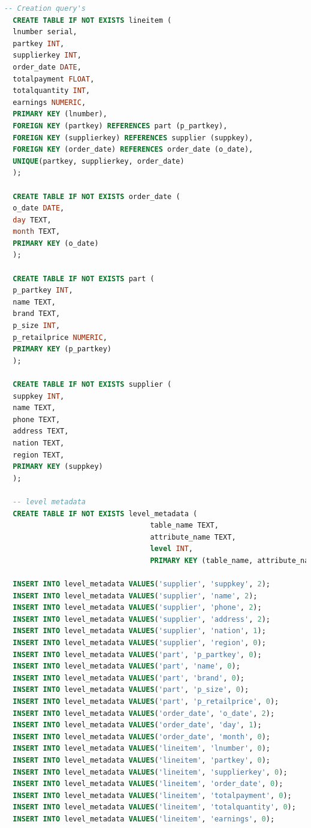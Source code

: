 \begin{lstlisting}[label={genquery2}, caption={Consultas de creaci\'on generadas para el experimento 2}, language={sql}]
  -- Creation query's
  CREATE TABLE IF NOT EXISTS lineitem (
  lnumber serial, 
  partkey INT, 
  supplierkey INT, 
  order_date DATE, 
  totalpayment FLOAT, 
  totalquantity INT, 
  earnings NUMERIC, 
  PRIMARY KEY (lnumber), 
  FOREIGN KEY (partkey) REFERENCES part (p_partkey), 
  FOREIGN KEY (supplierkey) REFERENCES supplier (suppkey), 
  FOREIGN KEY (order_date) REFERENCES order_date (o_date), 
  UNIQUE(partkey, supplierkey, order_date)
  );

  CREATE TABLE IF NOT EXISTS order_date (
  o_date DATE, 
  day TEXT, 
  month TEXT, 
  PRIMARY KEY (o_date)
  );

  CREATE TABLE IF NOT EXISTS part (
  p_partkey INT, 
  name TEXT, 
  brand TEXT, 
  p_size INT, 
  p_retailprice NUMERIC, 
  PRIMARY KEY (p_partkey)
  );

  CREATE TABLE IF NOT EXISTS supplier (
  suppkey INT, 
  name TEXT, 
  phone TEXT, 
  address TEXT, 
  nation TEXT, 
  region TEXT, 
  PRIMARY KEY (suppkey)
  );

  -- level metadata 
  CREATE TABLE IF NOT EXISTS level_metadata (
                                  table_name TEXT,
                                  attribute_name TEXT,
                                  level INT,
                                  PRIMARY KEY (table_name, attribute_name, level));

  INSERT INTO level_metadata VALUES('supplier', 'suppkey', 2);
  INSERT INTO level_metadata VALUES('supplier', 'name', 2);
  INSERT INTO level_metadata VALUES('supplier', 'phone', 2);
  INSERT INTO level_metadata VALUES('supplier', 'address', 2);
  INSERT INTO level_metadata VALUES('supplier', 'nation', 1);
  INSERT INTO level_metadata VALUES('supplier', 'region', 0);
  INSERT INTO level_metadata VALUES('part', 'p_partkey', 0);
  INSERT INTO level_metadata VALUES('part', 'name', 0);
  INSERT INTO level_metadata VALUES('part', 'brand', 0);
  INSERT INTO level_metadata VALUES('part', 'p_size', 0);
  INSERT INTO level_metadata VALUES('part', 'p_retailprice', 0);
  INSERT INTO level_metadata VALUES('order_date', 'o_date', 2);
  INSERT INTO level_metadata VALUES('order_date', 'day', 1);
  INSERT INTO level_metadata VALUES('order_date', 'month', 0);
  INSERT INTO level_metadata VALUES('lineitem', 'lnumber', 0);
  INSERT INTO level_metadata VALUES('lineitem', 'partkey', 0);
  INSERT INTO level_metadata VALUES('lineitem', 'supplierkey', 0);
  INSERT INTO level_metadata VALUES('lineitem', 'order_date', 0);
  INSERT INTO level_metadata VALUES('lineitem', 'totalpayment', 0);
  INSERT INTO level_metadata VALUES('lineitem', 'totalquantity', 0);
  INSERT INTO level_metadata VALUES('lineitem', 'earnings', 0);
\end{lstlisting}


